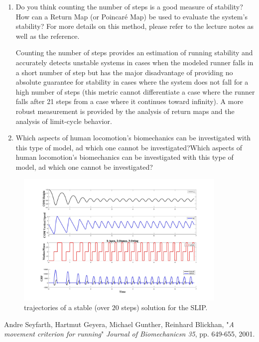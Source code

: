 \documentclass[11pt]{article}
\begin{document}
\begin{enumerate}
    \item Do you think counting the number of steps is a good measure of stability? How can a Return Map (or Poincaré Map) be used to evaluate the system's stability? For more details on this method, please refer to the lecture notes as well as the reference.
    \begin{adjustwidth}{0.5cm}{}
        Counting the number of steps provides an estimation of running stability and accurately detects unstable systems in cases when the modeled runner falls in a short number of step but has the major disadvantage of providing no absolute guarantee for stability in cases where the system does not fall for a high number of steps (this metric cannot differentiate a case where the runner falls after 21 steps from a case where it continues toward infinity). 
        \BlankLine
        A more robust measurement is provided by the analysis of return maps and the analysis of limit-cycle behavior.
        \[  \]
    \end{adjustwidth}

    \item Which aspects of human locomotion's biomechanics can be investigated with this type of model, ad which one cannot be investigated?Which aspects of human locomotion's biomechanics can be investigated with this type of model, ad which one cannot be investigated?
    \begin{adjustwidth}{0.5cm}{}
        
    \end{adjustwidth}
\end{enumerate}

\begin{figure}[h!]
    \centering
    \includegraphics[width=0.9\textwidth]{screens/run_1.jpg}
    \caption{trajectories of a stable (over $20$ steps) solution for the SLIP.}
\end{figure}

\begin{thebibliography}{1}

     Andre Seyfarth, Hartmut Geyera, Michael Gunther, Reinhard Blickhan, "\textit{A movement criterion for running}" \emph{Journal of Biomechanicsn 35}, pp. 649-655, 2001.

\end{thebibliography}
\end{document}
